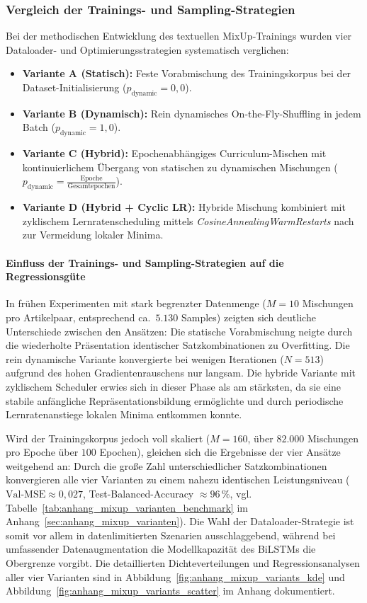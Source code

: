 \subsubsection{Vergleich der Trainings- und Sampling-Strategien}
Bei der methodischen Entwicklung des textuellen MixUp-Trainings wurden vier Dataloader- und Optimierungsstrategien systematisch verglichen:
\begin{itemize}
    \item \textbf{Variante A (Statisch):} Feste Vorabmischung des Trainingskorpus bei der Dataset-Initialisierung ($p_{\text{dynamic}} = 0{,}0$).
    \item \textbf{Variante B (Dynamisch):} Rein dynamisches On-the-Fly-Shuffling in jedem Batch ($p_{\text{dynamic}} = 1{,}0$).
    \item \textbf{Variante C (Hybrid):} Epochenabhängiges Curriculum-Mischen mit kontinuierlichem Übergang von statischen zu dynamischen Mischungen ($p_{\text{dynamic}} = \frac{\text{Epoche}}{\text{Gesamtepochen}}$).
    \item \textbf{Variante D (Hybrid + Cyclic LR):} Hybride Mischung kombiniert mit zyklischem Lernratenscheduling mittels \textit{CosineAnnealingWarmRestarts} nach \citet{loshchilov2016sgdr} zur Vermeidung lokaler Minima.
\end{itemize}

\paragraph{Einfluss der Trainings- und Sampling-Strategien auf die Regressionsgüte}
In frühen Experimenten mit stark begrenzter Datenmenge ($M = 10$ Mischungen pro Artikelpaar, entsprechend ca.~$5.130$ Samples) zeigten sich deutliche Unterschiede zwischen den Ansätzen: Die statische Vorabmischung neigte durch die wiederholte Präsentation identischer Satzkombinationen zu Overfitting. Die rein dynamische Variante konvergierte bei wenigen Iterationen ($N=513$) aufgrund des hohen Gradientenrauschens nur langsam. Die hybride Variante mit zyklischem Scheduler erwies sich in dieser Phase als am stärksten, da sie eine stabile anfängliche Repräsentationsbildung ermöglichte und durch periodische Lernratenanstiege lokalen Minima entkommen konnte.

Wird der Trainingskorpus jedoch voll skaliert ($M = 160$, über $82.000$ Mischungen pro Epoche über $100$ Epochen), gleichen sich die Ergebnisse der vier Ansätze weitgehend an: Durch die große Zahl unterschiedlicher Satzkombinationen konvergieren alle vier Varianten zu einem nahezu identischen Leistungsniveau ($\text{Val-MSE} \approx 0{,}027$, Test-Balanced-Accuracy $\approx 96\,\%$, vgl. Tabelle~\ref{tab:anhang_mixup_varianten_benchmark} im Anhang~\ref{sec:anhang_mixup_varianten}). Die Wahl der Dataloader-Strategie ist somit vor allem in datenlimitierten Szenarien ausschlaggebend, während bei umfassender Datenaugmentation die Modellkapazität des BiLSTMs die Obergrenze vorgibt. Die detaillierten Dichteverteilungen und Regressionsanalysen aller vier Varianten sind in Abbildung~\ref{fig:anhang_mixup_variants_kde} und Abbildung~\ref{fig:anhang_mixup_variants_scatter} im Anhang dokumentiert.

